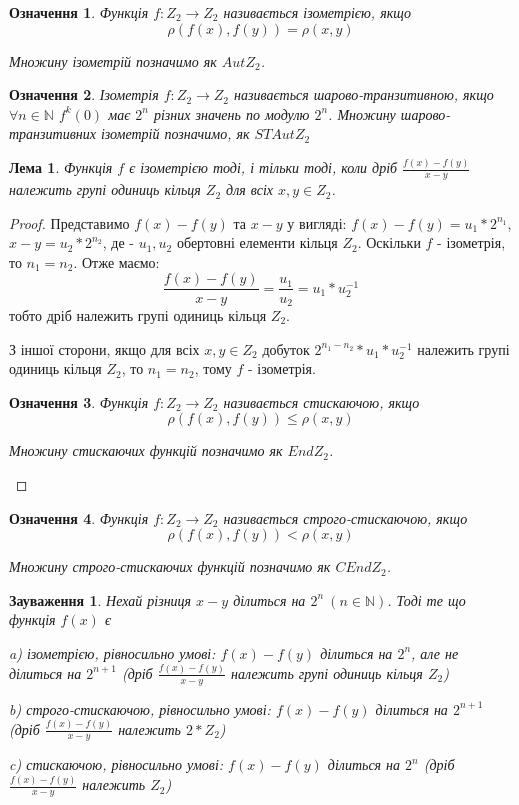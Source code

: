\documentclass[a4paper,12pt]{article} \usepackage{a4wide}
\numberwithin{equation}{subsection}
\newtheorem{lemma}{Лема}[subsection]
\newtheorem{remark}{Зауваження}[subsection]
\newtheorem{definition}{Означення}[subsection]
\begin{document}
\begin{definition}
  Функція $f:Z_2\rightarrow Z_2$ називається ізометрією,
  якщо $$\rho(f(x),f(y))=\rho(x,y)$$

  Множину ізометрій позначимо як $AutZ_2$.
\end{definition}



\begin{definition}
  Ізометрія $f:Z_2\rightarrow Z_2$ називається шарово-транзитивною,
  якщо $\forall n\in \mathbb{N} $ $f^k(0)$ має $2^n$ різних значень по
  модулю $2^n$. Множину шарово-транзитивних ізометрій позначимо, як
  $STAutZ_2$
\end{definition}

\begin{lemma} \label{lemmaizo}Функція $f$ є ізометрією тоді, і тільки
  тоді, коли дріб $\frac{f(x)-f(y)}{x-y}$ належить групі одиниць
  кільця $Z_2$ для всіх $x,y \in Z_2$.
\end{lemma}
\begin{proof}
  Представимо $f(x)-f(y) $ та $x-y $ у вигляді:
  $f(x)-f(y)=u_1*2^{n_1}$, $ x-y=u_2*2^{n_2}$, де - $u_1,u_2$
  обертовні елементи кільця $Z_2$. Оскільки $f$ - ізометрія, то
  $n_1=n_2$. Отже
  маємо:$$\frac{f(x)-f(y)}{x-y}=\frac{u_1}{u_2}=u_1*u_2^{-1}$$ тобто
  дріб належить групі одиниць кільця $Z_2$.

  З іншої сторони, якщо для всіх $x,y \in Z_2$ добуток
  $2^{n_1-n_2}*u_1*u_2^{-1}$ належить групі одиниць кільця $Z_2$, то
  $n_1=n_2$, тому $f$ - ізометрія.


  \begin{definition}
    Функція $f:Z_2\rightarrow Z_2$ називається стискаючою,
    якщо $$\rho(f(x),f(y))\leqslant \rho(x,y)$$

    Множину стискаючих функцій позначимо як $EndZ_2$.
  \end{definition}

\end{proof}
\begin{definition}
  Функція $f:Z_2\rightarrow Z_2$ називається строго-стискаючою,
  якщо $$\rho(f(x),f(y))< \rho(x,y)$$

  Множину строго-стискаючих функцій позначимо як $CEndZ_2$.
\end{definition}





\begin{remark}

  Нехай різниця $x-y$ ділиться на $2^n \ (n \in \mathbb{N})$. Тоді те
  що функція $f(x)$ є

  a) ізометрією, рівносильно умові: $f(x)-f(y)$ ділиться на $2^n$, але
  не ділиться на $2^{n+1}$ (дріб $\frac{f(x)-f(y)}{x-y}$ належить
  групі одиниць кільця $Z_2$)

  b) строго-стискаючою, рівносильно умові: $f(x)-f(y)$ ділиться на
  $2^{n+1}$(дріб $\frac{f(x)-f(y)}{x-y}$ належить $2*Z_2$)

  c) стискаючою, рівносильно умові: $f(x)-f(y)$ ділиться на $2^{n}$
  (дріб $\frac{f(x)-f(y)}{x-y}$ належить $Z_2$)
\end{remark}
\end{document}

